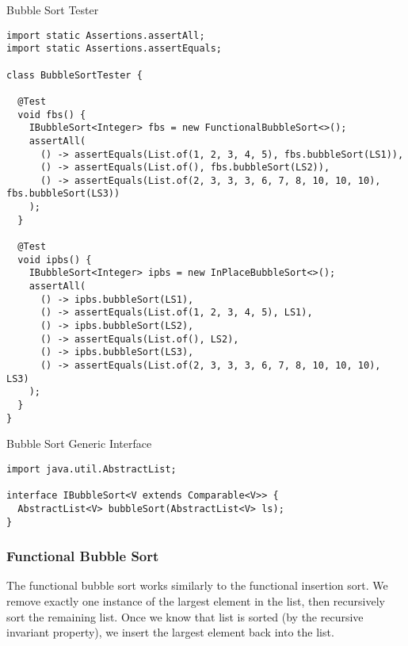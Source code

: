 \begin{cl}{Bubble Sort Tester}
\begin{lstlisting}[language=MyJava]
import static Assertions.assertAll;
import static Assertions.assertEquals;

class BubbleSortTester {

  @Test
  void fbs() {
    IBubbleSort<Integer> fbs = new FunctionalBubbleSort<>();
    assertAll(
      () -> assertEquals(List.of(1, 2, 3, 4, 5), fbs.bubbleSort(LS1)),
      () -> assertEquals(List.of(), fbs.bubbleSort(LS2)),
      () -> assertEquals(List.of(2, 3, 3, 3, 6, 7, 8, 10, 10, 10), fbs.bubbleSort(LS3))
    );
  }

  @Test
  void ipbs() {
    IBubbleSort<Integer> ipbs = new InPlaceBubbleSort<>();
    assertAll(
      () -> ipbs.bubbleSort(LS1),
      () -> assertEquals(List.of(1, 2, 3, 4, 5), LS1),
      () -> ipbs.bubbleSort(LS2),
      () -> assertEquals(List.of(), LS2),
      () -> ipbs.bubbleSort(LS3),
      () -> assertEquals(List.of(2, 3, 3, 3, 6, 7, 8, 10, 10, 10), LS3)
    );
  }
}
\end{lstlisting}
\end{cl}

\begin{cl}{Bubble Sort Generic Interface}
\begin{lstlisting}[language=MyJava]
import java.util.AbstractList;

interface IBubbleSort<V extends Comparable<V>> {
  AbstractList<V> bubbleSort(AbstractList<V> ls);
}
\end{lstlisting}
\end{cl}

\subsubsection*{Functional Bubble Sort}
The functional bubble sort works similarly to the functional insertion sort. We remove exactly one instance of the largest element in the list, then recursively sort the remaining list. Once we know that list is sorted (by the recursive invariant property), we insert the largest element back into the list.

